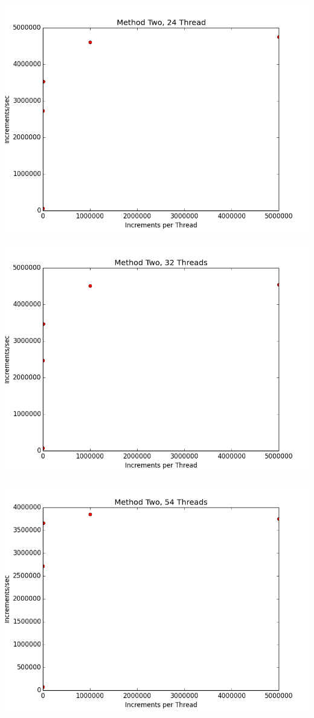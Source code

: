 \documentclass[12pt]{article}
\begin{document}
\includegraphics[scale=.5]{Graphs/MethodTwo_24Thread.png}

\includegraphics[scale=.5]{Graphs/MethodTwo_32Thread.png}

\includegraphics[scale=.5]{Graphs/MethodTwo_54Thread.png}
\end{document}
